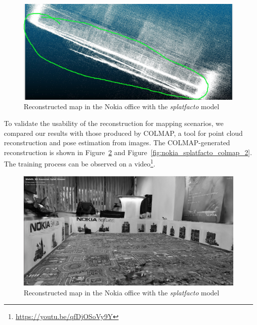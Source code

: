 \begin{figure}[htbp]
	\centering
	\includegraphics[width=150mm, keepaspectratio]{figures_jpg/pointcloud_debug1.jpg}
	\caption{Reconstructed map in the Nokia office with the \textit{splatfacto} model}
	\label{fig:pointcloud_debug1}
\end{figure}


To validate the usability of the reconstruction for mapping scenarios, we compared our results with those produced by COLMAP, a tool for point cloud reconstruction and pose estimation from images. The COLMAP-generated reconstruction is shown in Figure~\ref{fig:nokia_splatfacto_colmap_1} and Figure~\ref{fig:nokia_splatfacto_colmap_2}. The training process can be observed on a video\footnote{\url{https://youtu.be/qfDjOSoVy9Y}}.

\begin{figure}[htbp]
	\centering
	\includegraphics[width=150mm, keepaspectratio]{figures_jpg/nokia_splatfacto_1.jpg}
	\caption{Reconstructed map in the Nokia office with the \textit{splatfacto} model}
	\label{fig:nokia_splatfacto_colmap_1}
\end{figure}

